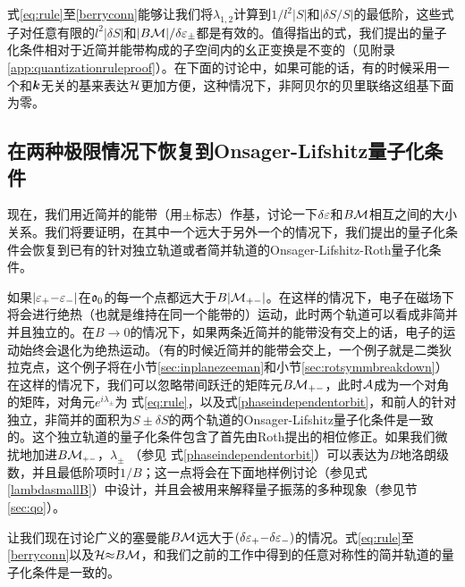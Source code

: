 式\ref{eq:rule}至\ref{berryconn}能够让我们将$\lambda_{1,2}$计算到$1/l^2|S|$和$|\delta S/S|$的最低阶，这些式子对任意有限的$l^2|\delta S|$和$|B{\cal M}|/\delta \varepsilon_{\pm}$都是有效的。值得指出的式，我们提出的量子化条件相对于近简并能带构成的子空间内的幺正变换是不变的（见附录\ref{app:quantizationruleproof}）。在下面的讨论中，如果可能的话，有的时候采用一个和$\boldsymbol{k}$无关的基来表达${\cal H}$更加方便，这种情况下，非阿贝尔的贝里联络这组基下面为零。

\subsection{在两种极限情况下恢复到Onsager-Lifshitz量子化条件}\label{sec:recoveronsager}

现在，我们用近简并的能带（用$\pm$标志）作基，讨论一下$\delta \varepsilon$和$B{\cal M}$相互之间的大小关系。我们将要证明，在其中一个远大于另外一个的情况下，我们提出的量子化条件会恢复到已有的针对独立轨道或者简并轨道的Onsager-Lifshitz-Roth量子化条件。

 如果$|\varepsilon_+{-}\varepsilon_-|$在$\mathfrak{o}_0$的每一个点都远大于$B|{\cal M}_{+-}|$。在这样的情况下，电子在磁场下将会进行绝热（也就是维持在同一个能带的）运动\cite{nenciu_review}，此时两个轨道可以看成非简并并且独立的。在$B{\rightarrow} 0$的情况下，如果两条近简并的能带没有交上的话，电子的运动始终会退化为绝热运动。（有的时候近简并的能带会交上，一个例子就是二类狄拉克点，这个例子将在小节\ref{sec:inplanezeeman}和小节\ref{sec:rotsymmbreakdown}）在这样的情况下，我们可以忽略带间跃迁的矩阵元$B{\cal M}_{+-}$，此时${\cal A}$成为一个对角的矩阵，对角元$e^{i\lambda_{\pm}}$为
式\ref{eq:rule}，以及式\ref{phaseindependentorbit}，和前人的针对独立，非简并的面积为$S{\pm}\delta S$的两个轨道的Onsager-Lifshitz量子化条件是一致的\cite{Onsager,lifshitz_kosevich,lifshitz_kosevich_jetp}。这个独立轨道的量子化条件包含了首先由Roth\cite{rothmag}提出的相位修正。如果我们微扰地加进$B{\cal M}_{\scriptscriptstyle{+-}}$，$\lambda_{\pm}$ （参见 式\ref{phaseindependentorbit}）可以表达为$B$地洛朗级数，并且最低阶项时$1/B$；这一点将会在下面地样例讨论（参见式 \ref{lambdasmallB}）中设计，并且会被用来解释量子振荡的多种现象（参见节\ref{sec:qo}）。


 让我们现在讨论广义的塞曼能$B{\cal M}$远大于$(\delta \varepsilon_+{-}\delta\varepsilon_-)$的情况。式\ref{eq:rule}至\ref{berryconn}以及${\cal H}{\approx}B{\cal M}$，和我们之前的工作中\cite{topoferm,100p}得到的任意对称性的简并轨道的量子化条件是一致的。


